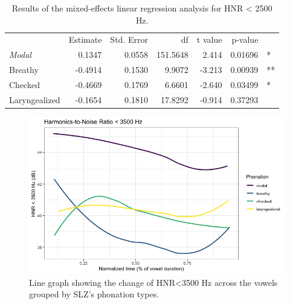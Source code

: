 \documentclass[12pt, letterpaper]{article}
\providecommand{\lsptoprule}{\midrule\toprule}
\providecommand{\lspbottomrule}{\bottomrule\midrule}
\begin{document}
\begin{table}[!h]
    \centering
    \caption{Results of the mixed-effects linear regression analysis for HNR < 2500 Hz.}
    \label{tab:HNR25}
    \begin{tabular}{lrrrrrl}
	\lsptoprule
					&  Estimate  & Std. Error & df & t value & p-value & \\
        \textit{Modal}  &  0.1347	& 0.0558 & 151.5648 &  2.414 & 0.01696 & * \\  
  	Breathy   		&  -0.4914 	& 0.1530 &  9.9072  & -3.213 & 0.00939 & ** \\
	Checked    		&  -0.4669  & 0.1769 &  6.6601  & -2.640 & 0.03499 & * \\
	Laryngealized	&  -0.1654  & 0.1810 & 17.8292  & -0.914 & 0.37293 & \\
    \lspbottomrule
    \end{tabular}
\end{table}

\begin{figure}[!h]
	\centering
	\includegraphics[width=.75\linewidth]{Images/HNR35.png}
	\caption{Line graph showing the change of HNR\textless 3500 Hz across the vowels grouped by SLZ's phonation types.}
	\label{fig:HNR35}
\end{figure}
\end{document}
